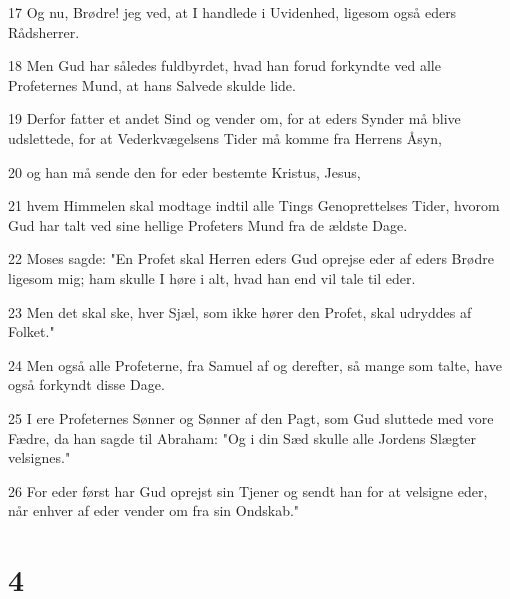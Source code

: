 \par 17 Og nu, Brødre! jeg ved, at I handlede i Uvidenhed, ligesom også eders Rådsherrer.
\par 18 Men Gud har således fuldbyrdet, hvad han forud forkyndte ved alle Profeternes Mund, at hans Salvede skulde lide.
\par 19 Derfor fatter et andet Sind og vender om, for at eders Synder må blive udslettede, for at Vederkvægelsens Tider må komme fra Herrens Åsyn,
\par 20 og han må sende den for eder bestemte Kristus, Jesus,
\par 21 hvem Himmelen skal modtage indtil alle Tings Genoprettelses Tider, hvorom Gud har talt ved sine hellige Profeters Mund fra de ældste Dage.
\par 22 Moses sagde: "En Profet skal Herren eders Gud oprejse eder af eders Brødre ligesom mig; ham skulle I høre i alt, hvad han end vil tale til eder.
\par 23 Men det skal ske, hver Sjæl, som ikke hører den Profet, skal udryddes af Folket."
\par 24 Men også alle Profeterne, fra Samuel af og derefter, så mange som talte, have også forkyndt disse Dage.
\par 25 I ere Profeternes Sønner og Sønner af den Pagt, som Gud sluttede med vore Fædre, da han sagde til Abraham: "Og i din Sæd skulle alle Jordens Slægter velsignes."
\par 26 For eder først har Gud oprejst sin Tjener og sendt han for at velsigne eder, når enhver af eder vender om fra sin Ondskab."

\chapter{4}

